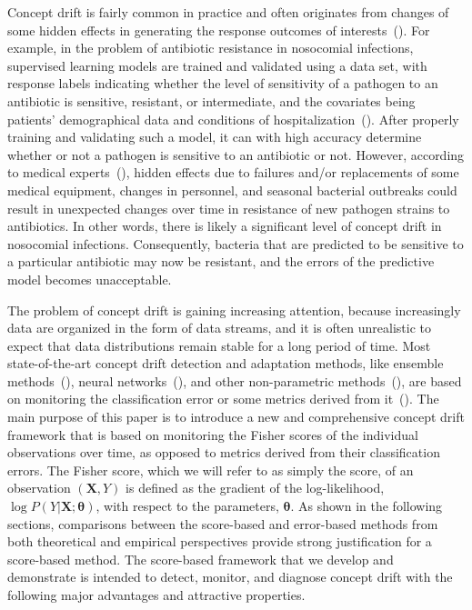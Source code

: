 \documentclass[twoside,11pt]{article}
\begin{document}
Concept drift is fairly common in practice and often originates from changes of some hidden effects in generating the response outcomes of interests~(\cite{tsymbal2008dynamic,vzliobaite2012beating,widmer1996learning,kukar2003drifting,donoho2004early,carmona2010gnusmail,fong2015change,vzliobaite2016overview}). For example, in the problem of antibiotic resistance in nosocomial infections, supervised learning models are trained and validated using a data set, with response labels indicating whether the level of sensitivity of a pathogen to an antibiotic is sensitive, resistant, or intermediate, and the covariates being patients' demographical data and conditions of hospitalization~(\cite{pechenizkiy2005knowledge}). After properly training and validating such a model, it can with high accuracy determine whether or not a pathogen is sensitive to an antibiotic or not. However, according to medical experts~(\cite{kukar2003drifting}), hidden effects due to failures and/or replacements of some medical equipment, changes in personnel, and seasonal bacterial outbreaks could result in unexpected changes over time in resistance of new pathogen strains to antibiotics. In other words, there is likely a significant level of concept drift in nosocomial infections. Consequently, bacteria that are predicted to be sensitive to a particular antibiotic may now be resistant, and the errors of the predictive model becomes unacceptable. 

The problem of concept drift is gaining increasing attention, because increasingly data are organized in the form of data streams, and it is often unrealistic to expect that data distributions remain stable for a long period of time. Most state-of-the-art concept drift detection and adaptation methods, like ensemble methods~(\cite{wang2003mining}), neural networks~(\cite{calandra2012learning}), and other non-parametric methods~(\cite{bifet2007learning,frias2015online}), are based on monitoring the classification error or some metrics derived from it~(\cite{ross2012exponentially,gonccalves2014comparative,barros2018large}). The main purpose of this paper is to introduce a new and comprehensive concept drift framework that is based on monitoring the Fisher scores of the individual observations over time, as opposed to metrics derived from their classification errors. The Fisher score, which we will refer to as simply the score, of an observation $(\bm{X}, Y)$ is defined as the gradient of the log-likelihood, $\log{P(Y|\bm{X};\bm{\theta})}$, with respect to the parameters, $\bm{\theta}$. As shown in the following sections, comparisons between the score-based and error-based methods from both theoretical and empirical perspectives provide strong justification for a score-based method. The score-based framework that we develop and demonstrate is intended to detect, monitor, and diagnose concept drift with the following major advantages and attractive properties.
\end{document}
